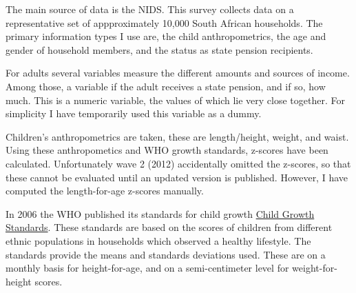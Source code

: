 \documentclass[a4paper]{book}\usepackage{graphicx, color}
\begin{document}
The main source of data is the NIDS. This survey collects data on a
representative set of appproximately 10,000 South African households.
The primary information types I use are, the child anthropometrics, the
age and gender of household members, and the status as state pension
recipients.

For adults several variables measure the different amounts and sources
of income. Among those, a variable if the adult receives a state
pension, and if so, how much. This is a numeric variable, the values of
which lie very close together. For simplicity I have temporarily used
this variable as a dummy.

Children's anthropometrics are taken, these are length/height, weight,
and waist. Using these anthropometics and WHO growth standards, z-scores
have been calculated. Unfortunately wave 2 (2012) accidentally omitted
the z-scores, so that these cannot be evaluated until an updated version
is published. However, I have computed the length-for-age z-scores
manually.

In 2006 the WHO published its standards for child growth
\href{http://www.who.int/childgrowth/en/}{Child Growth Standards}. These
standards are based on the scores of children from different ethnic
populations in households which observed a healthy lifestyle. The
standards provide the means and standards deviations used. These are on
a monthly basis for height-for-age, and on a semi-centimeter level for
weight-for-height scores.
\end{document}
